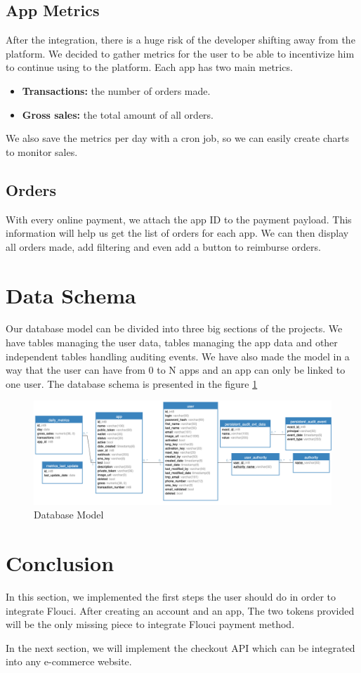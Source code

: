 \begin{spacing}{1.2}
\subsection{App Metrics}
After the integration, there is a huge  risk of the developer shifting away from the platform. We decided to gather metrics for the user to be able to incentivize him to continue using to the platform.
Each app has two main metrics.
\begin{itemize}
	\item \textbf{Transactions:} the number of orders made.
	\item \textbf{Gross sales:} the total amount of all orders.
\end{itemize}
We also save the metrics per day with a cron job, so we can easily create charts to monitor sales.

\subsection{Orders}
With every online payment, we attach the app ID to the payment payload. This information will help us get the list of orders for each app.
We can then display all orders made, add filtering and even add a button to reimburse orders.

\section{Data Schema}
Our database model can be divided into three big sections of the projects. We have tables managing the user data, tables managing the app data and other independent tables handling auditing events. We have also made the model in a way that the user can have from 0 to N apps and an app can only be linked to one user.
The database schema is presented in the figure \ref{fig:database}
\begin{figure}[H]\centering
\includegraphics[width=\textwidth,keepaspectratio]{db.png}
\caption{Database Model}
\label{fig:database}
\end{figure}

\section*{Conclusion}
In this section, we implemented the first steps the user should do in order to integrate Flouci. After creating an account and an app, The two tokens provided will be the only missing piece to integrate Flouci payment method.

In the next section, we will implement the checkout API which can be integrated into any e-commerce website.
\end{spacing}
